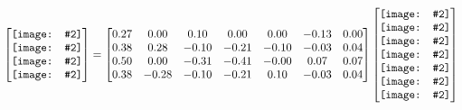 \documentclass[preview, border={0pt 10pt 0pt 0pt}]{standalone}
\def\xpic#1#2{\texttt{[image: \#2]}}
\def\xpicbig#1#2{\texttt{[image: \#2]}}
\def\pic#1#2{{%
      \mathchoice
        {\xpic{#1}{#2}}%
        {\xpic{#1}{#2}}%
        {\xpic{\defaultscriptratio}{#2}}%
        {\xpic{\defaultscriptscriptratio}{#2}}}}
\def\picbig#1#2{{%
      \mathchoice
        {\xpicbig{#1}{#2}}%
        {\xpicbig{#1}{#2}}%
        {\xpicbig{\defaultscriptratio}{#2}}%
        {\xpicbig{\defaultscriptscriptratio}{#2}}}}
\begin{document}
    \begin{align*}
      \begin{bmatrix}
         \picbig{2.0}{sch0}\\\picbig{2.0}{sch1}\\\picbig{2.0}{sch2}\\\picbig{2.0}{sch3}\\
      \end{bmatrix} =
      \begin{bmatrix}
         0.27 & 0.00 & 0.10 & 0.00 & 0.00 & -0.13 & 0.00 \\0.38 & 0.28 & -0.10 & -0.21 & -0.10 & -0.03 & 0.04 \\0.50 & 0.00 & -0.31 & -0.41 & -0.00 & 0.07 & 0.07 \\0.38 & -0.28 & -0.10 & -0.21 & 0.10 & -0.03 & 0.04 \\
      \end{bmatrix}
      \begin{bmatrix}
        \pic{1.0}{sph0}\\\pic{1.0}{sph1}\\\pic{1.0}{sph2}\\\pic{1.0}{sph3}\\\pic{1.0}{sph4}\\\pic{1.0}{sph5}\\\pic{1.0}{sph6}\\   
      \end{bmatrix}
    \end{align*}
    
\end{document}
